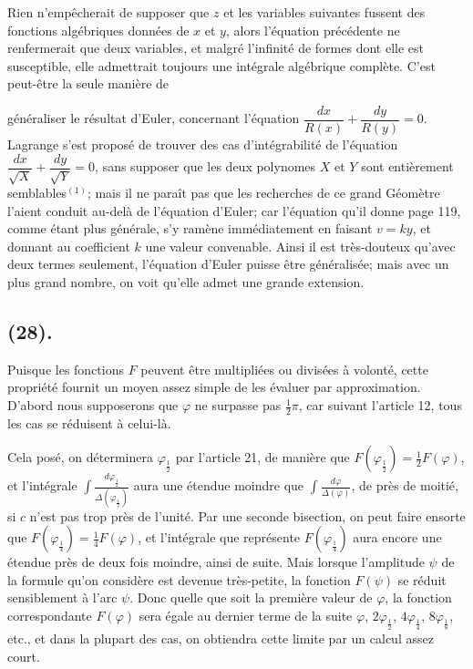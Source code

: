 \documentclass{article}
\begin{document}
Rien n'empêcherait de supposer que $z$ et les variables suivantes fussent des fonctions algébriques données de $x$ et $y$, alors l'équation précédente ne renfermerait que deux variables, et malgré l'infinité de formes dont elle est susceptible, elle admettrait toujours une intégrale algébrique complète. C'est peut-être la seule manière de

généraliser le résultat d'Euler, concernant l'équation $\dfrac{dx}{R(x)}+\dfrac{dy}{R(y)}=0$. Lagrange s'est proposé de trouver des cas d'intégrabilité de l'équation $\dfrac{dx}{\sqrt{X}}+\dfrac{dy}{\sqrt{Y}}=0$, sans supposer que les deux polynomes $X$ et $Y$ sont entièrement semblables${}^{(1)}$; mais il ne paraît pas que les recherches de ce grand Géomètre l'aient conduit au-delà de l'équation d'Euler; car l'équation qu'il donne page 119, comme étant plus générale, s'y ramène immédiatement en faisant $v=ky$, et donnant au coefficient $k$ une valeur convenable. Ainsi il est très-douteux qu'avec deux termes seulement, l'équation d'Euler puisse être généralisée; mais avec un plus grand nombre, on voit qu'elle admet une grande extension.

\subsection*{(28).}

Puisque les fonctions $F$ peuvent être multipliées ou divisées à volonté, cette propriété fournit un moyen assez simple de les évaluer par approximation. D'abord nous supposerons que $\varphi$ ne surpasse pas $\frac{1}{2}\pi$, car suivant l'article 12, tous les cas se réduisent à celui-là.

Cela posé, on déterminera $\varphi_{\frac{1}{2}}$ par l'article 21, de manière que $F(\varphi_{\frac{1}{2}})=\frac{1}{2}F(\varphi)$, et l'intégrale $\displaystyle\int\frac{d\varphi_{\frac{1}{2}}}{\Delta(\varphi_{\frac{1}{2}})}$ aura une étendue moindre que $\displaystyle\int\frac{d\varphi}{\Delta(\varphi)}$, de près de moitié, si $c$ n'est pas trop près de l'unité. Par une seconde bisection, on peut faire ensorte que $F(\varphi_{\frac{1}{4}})=\frac{1}{4}F(\varphi)$, et l'intégrale que représente $F(\varphi_{\frac{1}{4}})$ aura encore une étendue près de deux fois moindre, ainsi de suite. Mais lorsque l'amplitude $\psi$ de la formule qu'on considère est devenue très-petite, la fonction $F(\psi)$ se réduit sensiblement à l'arc $\psi$. Donc quelle que soit la première valeur de $\varphi$, la fonction correspondante $F(\varphi)$ sera égale au dernier terme de la suite $\varphi$, $2\varphi_{\frac{1}{2}}$, $4\varphi_{\frac{1}{4}}$, $8\varphi_{\frac{1}{8}}$, etc., et dans la plupart des cas, on obtiendra cette limite par un calcul assez court.
\end{document}

